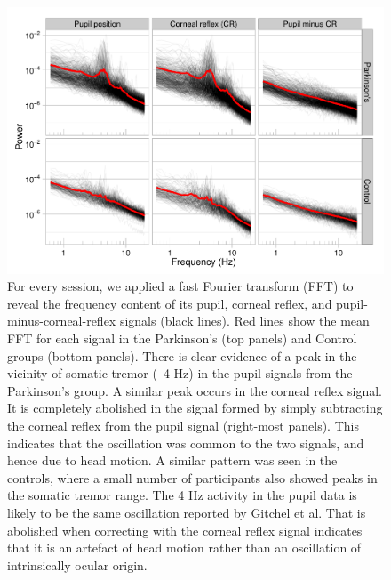 \documentclass[jou,a4paper]{apa6}
\begin{document}
\begin{figure}[htbp]
\begin{center}
\includegraphics {Figures/Figure_3_Individual_FFTs}
\caption{For every session, we applied a fast Fourier transform (FFT) to reveal the frequency content of its pupil, corneal reflex, and pupil-minus-corneal-reflex signals (black lines). Red lines show the mean FFT for each signal in the Parkinson's (top panels) and Control groups (bottom panels). There is clear evidence of a peak in the vicinity of somatic tremor (~4 Hz) in the pupil signals from the Parkinson's group. A similar peak occurs in the corneal reflex signal. It is completely abolished in the signal formed by simply subtracting the corneal reflex from the pupil signal (right-most panels). This indicates that the oscillation was common to the two signals, and hence due to head motion. A similar pattern was seen in the controls, where a small number of participants also showed peaks in the somatic tremor range. The 4 Hz activity in the pupil data is likely to be the same oscillation reported by Gitchel et al. That is abolished when correcting with the corneal reflex signal indicates that it is an artefact of head motion rather than an oscillation of intrinsically ocular origin.}
\label{fig:FFT}
\end{center}
\end{figure}
\end{document}
